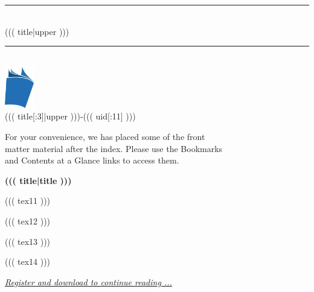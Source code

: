 \documentclass{article}
\newcommand{\HRule}{\rule{\linewidth}{1mm}}
\begin{document}
\begin{titlepage}

\pagecolor{titlepagecolor}
\color{white}

\begin{flushright}
\textcolor{white}{ }

\vspace{7cm}

\HRule \\[0.4cm]
{\large ((( title|upper )))}\\[0.4cm]
\HRule \\[2.5cm]

\includegraphics[height=18mm]{book-icon.png} \\[2mm]
\scriptsize{((( title[:3]|upper )))-((( uid[:11] )))}

\end{flushright}

\vfill

\begin{flushright}
\footnotesize{ For your convenience, we has placed some of the front \\
matter material after the index. Please use the Bookmarks \\
and Contents at a Glance links to access them. }
\end{flushright}

\end{titlepage}

\nopagecolor %


\noindent
{\textbf {\footnotesize ((( title|title )))}}

\vspace{6pt}


((( tex11 )))

((( tex12 )))

((( tex13 )))

((( tex14 )))

\vspace{15pt}

\noindent
{\color{blue}
\emph{
\large{
\underline{
\href{http://www.seepdf.com/download/((( title|title )))}{Register and download to continue reading ...}
}}}}
\end{document}
